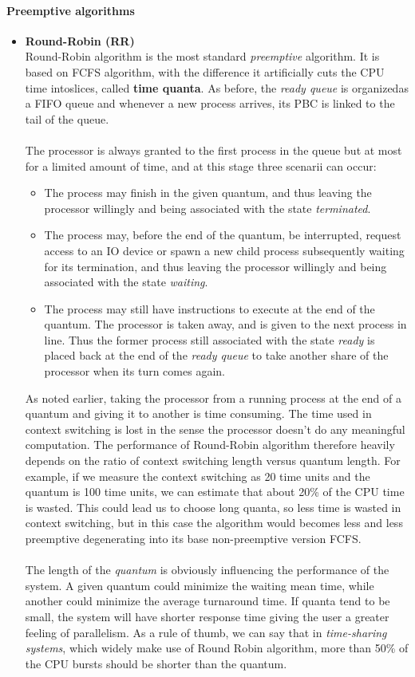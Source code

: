 \documentclass[11pt,a4paper]{scrreprt}
\begin{document}
\paragraph{Preemptive algorithms}
\begin{itemize}
\item \textbf{Round-Robin (RR)} \\
Round-Robin algorithm is the most standard \textit{preemptive} algorithm. It is based on FCFS algorithm, with the difference it artificially cuts the CPU time intoslices, called \textbf{time quanta}. As before, the \textit{ready queue} is organizedas a FIFO queue and whenever a new process arrives, its PBC is linked to the tail of the queue. \\\\
The processor is always granted to the first process in the queue but at most for a limited amount of time, and at this stage three scenarii can occur:
\begin{itemize}
\item The process may finish in the given quantum, and thus leaving the processor willingly and being associated with the state \textit{terminated}.
\item The process may, before the end of the quantum, be interrupted, request access to an IO device or spawn a new child process subsequently waiting for its termination, and thus leaving the processor willingly and being associated with the state \textit{waiting}.
\item The process may still have instructions to execute at the end of the quantum. The processor is taken away, and is given to the next process in line. Thus the former process still associated with the state \textit{ready} is placed back at the end of the \textit{ready queue} to take another share of the processor when its turn comes again.
\end{itemize}
As noted earlier, taking the processor from a running process at the end of a quantum and giving it to another is time consuming. The time used in context switching is lost in the sense the processor doesn’t do any meaningful computation. The performance of Round-Robin algorithm therefore heavily depends on the ratio of context switching length versus quantum length. For example, if we measure the context switching as 20 time units and the quantum is 100 time units, we can estimate that about 20\% of the CPU time is wasted. This could lead us to choose long quanta, so less time is wasted in context switching, but in this case the algorithm would becomes less and less preemptive degenerating into its base non-preemptive version FCFS. \\\\
The length of the \textit{quantum} is obviously influencing the performance of the system. A given quantum could minimize the waiting mean time, while another could minimize the average turnaround time. If quanta tend to be small, the system will have shorter response time giving the user a greater feeling of parallelism. As a rule of thumb, we can say that in \textit{time-sharing systems}, which widely make use of Round Robin algorithm, more than 50\% of the CPU bursts should be shorter than the quantum.


\end{itemize}
\end{document}
